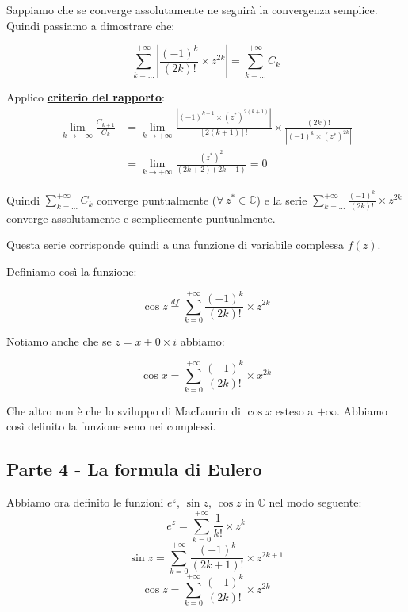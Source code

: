 \documentclass[../../dimostrazioni]{subfiles}
\begin{document}
                Sappiamo che se converge assolutamente ne seguirà la convergenza semplice. Quindi passiamo a dimostrare che:

                \[  \sum_{k=\dots}^{+\infty} \left| \frac{(-1)^k}{(2k)!} \times z^{2k} \right| = \sum_{k=\dots}^{+\infty} C_k \]

                Applico \textbf{\hyperref[criterioRapportoSerie]{criterio del rapporto}}:
                \begin{align*}
                    \lim_{k \to +\infty} \frac{C_{k+1}}{C_k} &= \lim_{k \to +\infty} \frac{\left| (-1)^{k+1} \times (z^*)^{2(k+1)}\right|}{\left[2(k+1)\right]!} \times \frac{\left(2k\right)!}{\left| (-1)^k \times (z^*)^{2k}\right|} \\
                    &= \lim_{k \to +\infty} \frac{(z^*)^2}{(2k+2)(2k+1)} = 0
                \end{align*}

                Quindi \(\sum_{k=\dots}^{+\infty} C_k\) converge puntualmente (\(\forall \, z^* \in \mathbb{C}\)) 
                e la serie  \(\sum_{k=\dots}^{+\infty} \frac{(-1)^k}{(2k)!} \times z^{2k}\) converge assolutamente e semplicemente puntualmente.

                Questa serie corrisponde quindi a una funzione di variabile complessa \(f(z)\).

                Definiamo così la funzione:

                \[  \cos z \stackrel{df}{=} \sum_{k=0}^{+\infty} \frac{(-1)^k}{(2k)!} \times z^{2k}    \]

                Notiamo anche che se \(z = x + 0 \times i\) abbiamo:

                \[  \cos x = \sum_{k=0}^{+\infty} \frac{(-1)^k}{(2k)!} \times x^{2k} \]

                Che altro non è che lo sviluppo di MacLaurin di \(\cos x\) esteso a \(+\infty\). 
                Abbiamo così definito la funzione seno nei complessi.

            \subsection*{Parte 4 - \textbf{La formula di Eulero}}

                Abbiamo ora definito le funzioni \(e^z\), \(\sin z\), \(\cos z\) in \(\mathbb{C}\) nel modo seguente:
                \[  e^z  =  \sum_{k=0}^{+\infty} \frac{1}{k!} \times z^k    \]
                \[  \sin z = \sum_{k=0}^{+\infty} \frac{(-1)^k}{(2k+1)!} \times z^{2k+1} \]
                \[  \cos z = \sum_{k=0}^{+\infty} \frac{(-1)^k}{(2k)!} \times z^{2k}    \]
\end{document}
